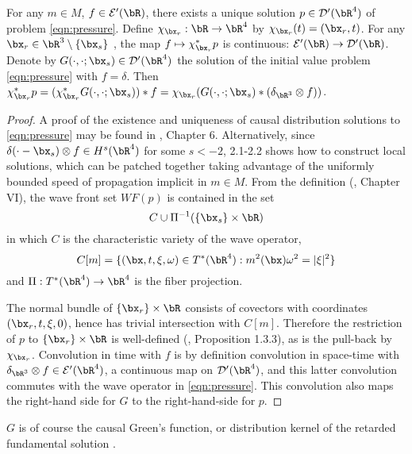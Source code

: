 \begin{theorem}
\label{thm:trace}
For any $m \in M$, $f \in {\cal E}'(\bR)$, there exists a unique solution $p \in {\cal D}'(\bR^4)$ of problem
\ref{eqn:pressure}. Define $\chi_{\bx_r}: \bR \rightarrow \bR^4$ by
$\chi_{\bx_r}(t) = (\bx_r,t)$. For any $\bx_r \in \bR^3\setminus
\{\bx_s\}$ , the map $f\mapsto \chi_{\bx_r}^*p$ is continuous: ${\cal E}'(\bR) \rightarrow
{\cal D}'(\bR)$. Denote by $G(\cdot,\cdot;\bx_s) \in {\cal D}'(\bR^4)$
the solution of the initial value problem
\ref{eqn:pressure} with $f = \delta$. Then $\chi_{\bx_r}^*p =
(\chi_{\bx_r}^*G(\cdot,\cdot;\bx_s))*f =
\chi_{\bx_r}(G(\cdot,\cdot;\bx_s)*(\delta_{\bR^3}\otimes f))$. 
\end{theorem}
\begin{proof}
  A proof of the existence and uniqueness of causal distribution
  solutions to \ref{eqn:pressure} may be found in \cite{Lax:PDENotes},
  Chapter 6. Alternatively, since $\delta(\cdot-\bx_s)\otimes f \in
  H^s(\bR^4)$ for some $s < -2$, \cite{Tay:81} 2.1-2.2 shows
  how to construct local solutions, which can be patched together
  taking advantage of the uniformly bounded speed of propagation
  implicit in $m \in M$. From the definition (\cite{Tay:81}, Chapter VI), the wave front set
  $WF(p)$ is contained in the set
\[
C \cup \Pi^{-1}({\{\bx_s\} \times \bR})
\]
in which $C$ is the characteristic variety of the wave operator,
\begin{equation}
\label{eqn:charvar}
C[m] = \{(\bx,t,\xi,\omega) \in T^*(\bR^4): m^2(\bx)\omega^2 =
|\xi|^2\}
\end{equation}
and  $\Pi: T^*(\bR^4) \rightarrow \bR^4$ is the fiber projection.

The normal bundle of $\{\bx_r\} \times \bR$ consists of covectors with
coordinates $(\bx_r,t,\xi,0)$, hence has trivial intersection with
$C[m]$. Therefore the restriction of $p$ to $\{\bx_r\} \times \bR$ is
well-defined (\cite{Dui:95}, Proposition 1.3.3), as is the pull-back
by $\chi_{\bx_r}$. Convolution in time
with $f$ is by definition convolution in space-time with
$\delta_{\bR^3} \otimes f \in {\cal E}'(\bR^4)$, a continuous map on ${\cal
  D'}(\bR^4)$,  and this latter convolution commutes with
the wave operator in \ref{eqn:pressure}. This convolution also maps
the right-hand side for $G$ to the right-hand-side for $p$.
\end{proof}

\begin{rem} $G$ is of course the causal Green's function, or distribution
  kernel of the retarded fundamental solution \cite[]{CourHil:62}.
\end{rem}

